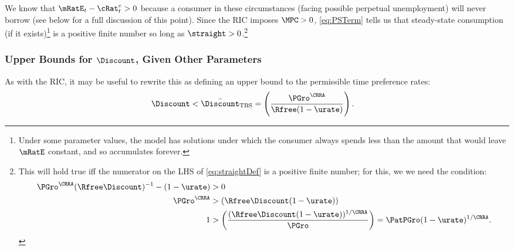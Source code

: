 \documentclass{\handout}
\begin{document}
We know that $\mRatE_{t}-{\cRat}^{e}_{t} > 0$ because a consumer in these circumstances (facing possible perpetual unemployment) will never borrow (see below for a full discussion of this point).  Since the RIC imposes $\MPCU>0$, \eqref{eq:PSTerm} tells us that steady-state consumption (if it exists)\footnote{Under some parameter values, the model has solutions under which the consumer always spends less than the amount that would leave $\mRatE$ constant, and so accumulates forever.} is a positive finite number so long as $\straight > 0$.\footnote{This will hold true iff the numerator on the LHS of \eqref{eq:straightDef} is a positive finite number; for this, we we need the condition:
\begin{equation}\begin{gathered}\begin{aligned}
        \PGro^{\CRRA}(\Rfree\Discount)^{-1}-(1-\urate) & >  0  \\
       \PGro^{\CRRA} & >  (\Rfree \Discount (1-\urate))
\\     1 & >  \left(\frac{(\Rfree \Discount (1-\urate))^{1/\CRRA}}{\PGro}\right) = \PatPGro (1-\urate)^{1/\CRRA} 
  \label{eq:GICExistsSoln} %
.\end{aligned}\end{gathered}\end{equation}
}

\hypertarget{GIFMax}{}\hypertarget{DiscountMaxGICTBS}{}

\subsubsection{Upper Bounds for $\Discount$, Given Other Parameters}


As with the RIC, it may be useful to rewrite this as defining an upper bound to the permissible time preference rates: 
\begin{equation}\begin{gathered}\begin{aligned}
\Discount < \DiscountMaxGICTBS & =  \left(\frac{\PGro^{\CRRA}}{\Rfree(1-\urate)}\right) \label{eq:DiscountMaxGICTBS}
.
\end{aligned}\end{gathered}\end{equation}
\end{document}
